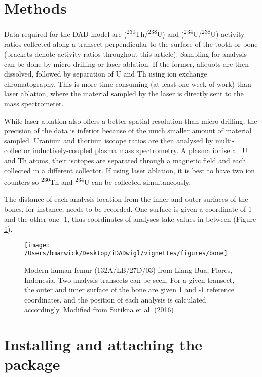 \documentclass[]{elsarticle} %
\begin{document}
\hypertarget{methods}{%
\section{Methods}\label{methods}}

Data required for the DAD model are (\textsuperscript{230}Th/\textsuperscript{238}U) and (\textsuperscript{234}U/\textsuperscript{238}U) activity ratios collected along a transect perpendicular to the surface of the tooth or bone (brackets denote activity ratios throughout this article). Sampling for analysis can be done by micro-drilling or laser ablation. If the former, aliquots are then dissolved, followed by separation of U and Th using ion exchange chromatography. This is more time consuming (at least one week of work) than laser ablation, where the material sampled by the laser is directly sent to the mass spectrometer.

While laser ablation also offers a better spatial resolution than micro-drilling, the precision of the data is inferior because of the much smaller amount of material sampled. Uranium and thorium isotope ratios are then analysed by multi-collector inductively-coupled plasma mass spectrometry. A plasma ionise all U and Th atoms, their isotopes are separated through a magnetic field and each collected in a different collector. If using laser ablation, it is best to have two ion counters so \textsuperscript{230}Th and \textsuperscript{234}U can be collected simultaneously.

The distance of each analysis location from the inner and outer surfaces of the bones, for instance, needs to be recorded. One surface is given a coordinate of 1 and the other one -1, thus coordinates of analyses take values in between (Figure \ref{fig:femurpic}).



\begin{figure}
\texttt{[image: /Users/bmarwick/Desktop/iDADwigl/vignettes/figures/bone]} \caption{Modern human femur (132A/LB/27D/03) from Liang Bua, Flores, Indonesia. Two analysis transects can be seen. For a given transect, the outer and inner surface of the bone are given 1 and -1 reference coordinates, and the position of each analysis is calculated accordingly. Modified from Sutikna et al. (2016)}\label{fig:femurpic}
\end{figure}

\FloatBarrier

\hypertarget{installing-and-attaching-the-package}{%
\section{Installing and attaching the package}\label{installing-and-attaching-the-package}}
\end{document}
